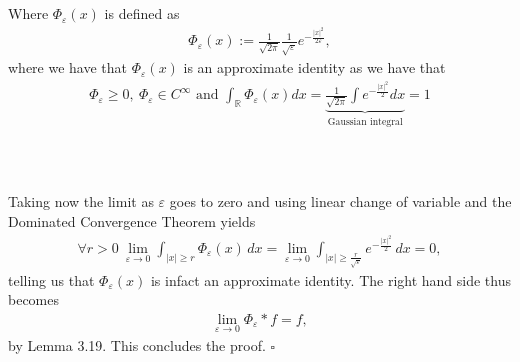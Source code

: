 \documentclass{beamer}
\numberwithin{equation}{section}
\begin{document}
\begin{frame}\frametitle{{\normalsize \secname} \\ {\large \subsecname}}
    Where $\Phi_\varepsilon(x)$ is defined as
    \begin{align}
        \Phi_\varepsilon(x) := \frac{1}{\sqrt{2\pi}}\frac{1}{\sqrt{\varepsilon}}e^{-\frac{|x|^2}{2\varepsilon}},
    \end{align}
    where we have that $\Phi_\varepsilon(x)$ is an approximate identity as we have that
    \begin{align}
        \Phi_\varepsilon \geq 0, \ \Phi_\varepsilon \in C^\infty \text{ and }
        \int_\mathbb{R} \Phi_\varepsilon(x) dx = \underbrace{\frac{1}{\sqrt{2 \pi}} \int e^{-\frac{|x|^2}{2}} dx}_{\text{Gaussian integral}} = 1
    \end{align}
\end{frame}

\begin{frame}\frametitle{{\normalsize \secname} \\ {\large \subsecname}}
    Taking now the limit as $\varepsilon$ goes to zero and using linear change of variable and the Dominated Convergence Theorem yields
    \begin{align}
        \forall r>0 \ \lim_{\varepsilon \rightarrow 0} \int_{|x| \geq r} \Phi_\varepsilon(x) \, dx = \lim_{\varepsilon \rightarrow 0} \int_{|x| \geq \frac{r}{\sqrt{\varepsilon}}} e^{-\frac{|x|^2}{2}} \, dx = 0,
    \end{align}
    telling us that $\Phi_\varepsilon(x)$ is infact an approximate identity.
    The right hand side thus becomes
    \begin{align}
        \lim_{\varepsilon \rightarrow 0} \Phi_\varepsilon * f = f,
    \end{align}
    by Lemma 3.19.
    This concludes the proof. \hfill $\square$
\end{frame}
\end{document}
